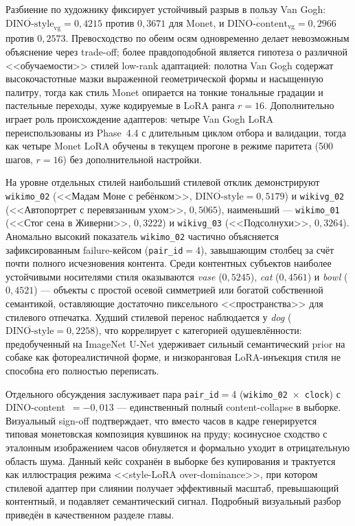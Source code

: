 Разбиение по художнику фиксирует устойчивый разрыв в пользу Van Gogh: $\overline{\mathrm{DINO\text{-}style}}_{\mathrm{vg}} = 0{,}4215$ против $0{,}3671$ для Monet, и $\overline{\mathrm{DINO\text{-}content}}_{\mathrm{vg}} = 0{,}2966$ против $0{,}2573$. Превосходство по обеим осям одновременно делает невозможным объяснение через trade-off; более правдоподобной является гипотеза о различной <<обучаемости>> стилей low-rank адаптацией: полотна Van Gogh содержат высокочастотные мазки выраженной геометрической формы и насыщенную палитру, тогда как стиль Monet опирается на тонкие тональные градации и пастельные переходы, хуже кодируемые в LoRA ранга $r=16$. Дополнительно играет роль происхождение адаптеров: четыре Van Gogh LoRA переиспользованы из Phase~4.4 с длительным циклом отбора и валидации, тогда как четыре Monet LoRA обучены в текущем прогоне в режиме паритета (500 шагов, $r=16$) без дополнительной настройки.

На уровне отдельных стилей наибольший стилевой отклик демонстрируют \texttt{wikimo\_02} (<<Мадам Моне с ребёнком>>, $\overline{\mathrm{DINO\text{-}style}}=0{,}5179$) и \texttt{wikivg\_02} (<<Автопортрет с перевязанным ухом>>, $0{,}5065$), наименьший --- \texttt{wikimo\_01} (<<Стог сена в Живерни>>, $0{,}3222$) и \texttt{wikivg\_03} (<<Подсолнухи>>, $0{,}3264$). Аномально высокий показатель \texttt{wikimo\_02} частично объясняется зафиксированным failure-кейсом (\texttt{pair\_id}$=$4), завышающим столбец за счёт почти полного исчезновения контента. Среди контентных субъектов наиболее устойчивыми носителями стиля оказываются \textit{vase} ($0{,}5245$), \textit{cat} ($0{,}4561$) и \textit{bowl} ($0{,}4521$) --- объекты с простой осевой симметрией или богатой собственной семантикой, оставляющие достаточно пиксельного <<пространства>> для стилевого отпечатка. Худший стилевой перенос наблюдается у \textit{dog} ($\overline{\mathrm{DINO\text{-}style}}=0{,}2258$), что коррелирует с категорией одушевлённости: предобученный на ImageNet U-Net удерживает сильный семантический prior на собаке как фотореалистичной форме, и низкоранговая LoRA-инъекция стиля не способна его полностью переписать.

Отдельного обсуждения заслуживает пара \texttt{pair\_id}$=$4 (\texttt{wikimo\_02}~$\times$~\texttt{clock}) с DINO-content~$=-0{,}013$ --- единственный полный content-collapse в выборке. Визуальный sign-off подтверждает, что вместо часов в кадре генерируется типовая монетовская композиция кувшинок на пруду; косинусное сходство с эталонным изображением часов обнуляется и формально уходит в отрицательную область шума. Данный кейс сохранён в выборке без купирования и трактуется как иллюстрация режима <<style-LoRA over-dominance>>, при котором стилевой адаптер при слиянии получает эффективный масштаб, превышающий контентный, и подавляет семантический сигнал. Подробный визуальный разбор приведён в качественном разделе главы.

